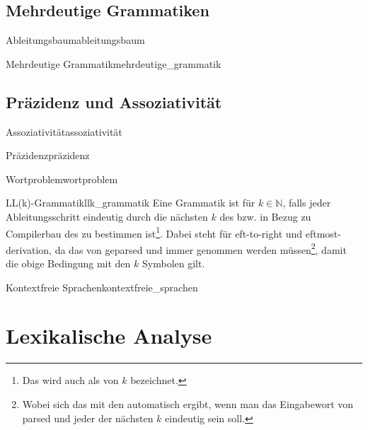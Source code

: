 \subsection{Mehrdeutige Grammatiken}
\begin{Definition}{Ableitungsbaum}{ableitungsbaum}
\end{Definition}
\begin{Definition}{Mehrdeutige Grammatik}{mehrdeutige_grammatik}
\end{Definition}
\subsection{Präzidenz und Assoziativität}
\begin{Definition}{Assoziativität}{assoziativität}
\end{Definition}
\begin{Definition}{Präzidenz}{präzidenz}
\end{Definition}
\begin{Definition}{Wortproblem}{wortproblem}
\end{Definition}
\begin{Definition}{LL(k)-Grammatik}{llk_grammatik}
  Eine Grammatik ist  für $k\in\mathbb{N}$, falls jeder Ableitungsschritt eindeutig durch die nächsten $k$  des  bzw. in Bezug zu Compilerbau  des  zu bestimmen ist\footnote{Das wird auch als  von $k$ bezeichnet.}. Dabei steht  für eft-to-right und eftmost-derivation, da das  von  geparsed und immer  genommen werden müssen\footnote{Wobei sich das mit den  automatisch ergibt, wenn man das Eingabewort von   parsed und jeder der nächsten $k$  eindeutig sein soll.}, damit die obige Bedingung mit den  $k$ Symbolen gilt.
\end{Definition}
\begin{Definition}{Kontextfreie Sprachen}{kontextfreie_sprachen}
\end{Definition}
\section{Lexikalische Analyse}
\label{sec:lexikalische_analyse}

